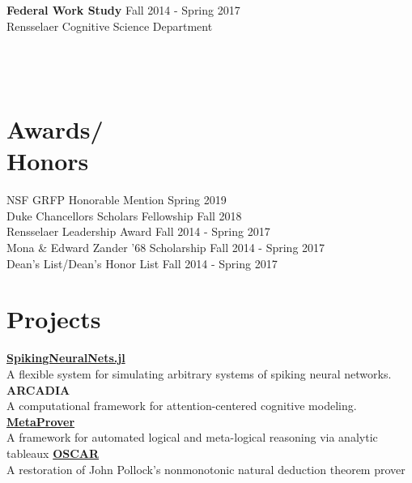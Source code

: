 \documentclass[margin]{res}
\begin{document}
\begin{resume}
  \textbf{Federal Work Study} \hfill Fall 2014 - Spring 2017 \\
  Rensselaer Cognitive Science Department \\


  
   \\
  
   \\
  
   \\

  \section{Awards/\\Honors}
  NSF GRFP Honorable Mention \hfill Spring 2019 \\
  Duke Chancellors Scholars Fellowship \hfill Fall 2018 \\
  Rensselaer Leadership Award \hfill Fall 2014 - Spring 2017 \\
  Mona \& Edward Zander '68 Scholarship \hfill Fall 2014 - Spring 2017 \\
  Dean's List/Dean's Honor List \hfill Fall 2014 - Spring 2017 \\

  
  
  \section{Projects}
  \href{https://github.com/pearsonlab/SpikingNeuralNets.jl}{\textbf{SpikingNeuralNets.jl}} \\
  A flexible system for simulating arbitrary systems of spiking neural networks. \\
  \textbf{ARCADIA} \\
  A computational framework for attention-centered cognitive modeling. 
  \href{https://github.com/kevingoneill/MetaProver}{\textbf{MetaProver}}
  \\ A framework for automated logical and meta-logical reasoning via
  analytic tableaux
  \href{http://rair.cogsci.rpi.edu/projects/automated-reasoners/oscar/}{\textbf{OSCAR}} \\
  A restoration of John Pollock's nonmonotonic natural deduction theorem prover \\


\end{resume}
\end{document}
